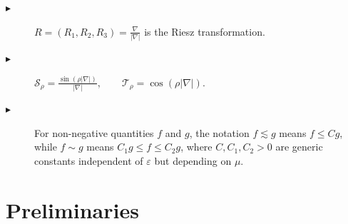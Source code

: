 \documentclass[11pt,twoside]{article}
\def\ds{\displaystyle}
\def\f{\frac}
\def\ve{\varepsilon}
\def\ls{\lesssim}
\theoremstyle{plain}
\theoremstyle{definition}
\theoremstyle{assumption}
\numberwithin{equation}{section}
\begin{document}
\begin{description}
		\item [$\blacktriangleright $]$R=(R_1,R_2,R_3)=\ds\f{\nabla}{|\nabla|}$ is the Riesz transformation.
		
		\item [$\blacktriangleright $]
		$
			\mathcal{S}_{\rho}
			=
			\ds\frac{\sin(\rho|\nabla|)}{|\nabla|},
			\qquad
			\mathcal{T}_{\rho}
			=
			\cos(\rho|\nabla|).
		$
		
		
		\item [$\blacktriangleright $]
			For non-negative quantities $f$ and $g$, the notation $f\ls g$ means
			$f\le Cg$, while $f\sim g$ means
			$C_1g\le f\le C_2g$, where $C,C_1,C_2>0$ are generic constants independent of $\ve$ but depending on $\mu$.
	
		
	\end{description}
	
	
	
	
	
	
	
	
	\section{Preliminaries}\label{sec:Preliminaries}
	
\end{document}
